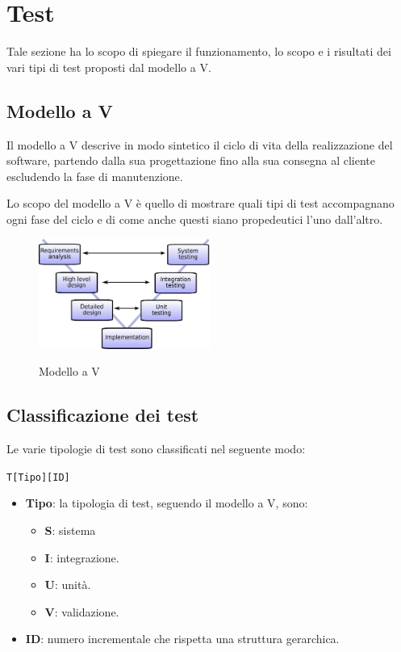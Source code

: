 \section{Test}

Tale sezione ha lo scopo di spiegare il funzionamento, lo scopo e i risultati dei vari tipi di test proposti dal modello a V.

\subsection{Modello a V}
Il modello a V descrive in modo sintetico il ciclo di vita della realizzazione del software, partendo dalla sua progettazione fino alla sua consegna al cliente escludendo la fase di manutenzione.

Lo scopo del modello a V è quello di mostrare quali tipi di test accompagnano ogni fase del ciclo e di come anche questi siano propedeutici l'uno dall'altro.

\begin{figure}[H]
	\centering
	\includegraphics[width=0.5\textwidth]{img/V-model.png}
	\label{img:vmodel}
	\caption{Modello a V\protect\footnotemark}
\end{figure}




\subsection{Classificazione dei test}
Le varie tipologie di test sono classificati nel seguente modo:

\begin{center}
	\texttt{T[Tipo][ID]}
\end{center}

\begin{itemize}
	\item \textbf{Tipo}: la tipologia di test, seguendo il modello a V, sono:
	\begin{itemize}
		\item \textbf{S}: sistema
		\item \textbf{I}: integrazione.
		\item \textbf{U}: unità.
		\item \textbf{V}: validazione. %
	\end{itemize}
	\item \textbf{ID}: numero incrementale che rispetta una struttura gerarchica.
\end{itemize}

